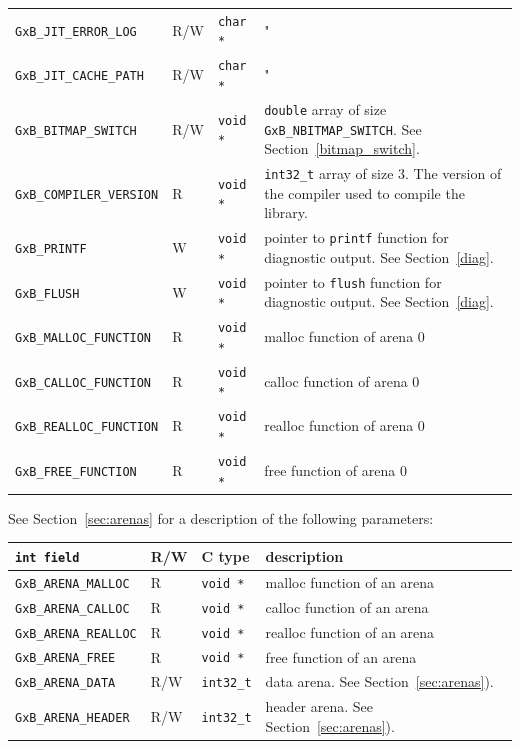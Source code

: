{\begin{tabular}{|l|l|l|p{2.5in}|}
\verb'GxB_JIT_ERROR_LOG'            & R/W  & \verb'char *' & " \\
\verb'GxB_JIT_CACHE_PATH'           & R/W  & \verb'char *' & " \\
\hline
\verb'GxB_BITMAP_SWITCH'            & R/W  & \verb'void *' & \verb'double' array of size \newline
                                                                \verb'GxB_NBITMAP_SWITCH'.  \newline
                                                                See Section~\ref{bitmap_switch}. \\
\verb'GxB_COMPILER_VERSION'         & R    & \verb'void *' & \verb'int32_t' array of size 3.
                                        The version of the compiler used to
                                        compile the library. \\
\verb'GxB_PRINTF'                   & W    & \verb'void *' & pointer to \verb'printf' function for diagnostic output.
                                                                See Section~\ref{diag}. \\
\verb'GxB_FLUSH'                    & W    & \verb'void *' & pointer to \verb'flush' function for diagnostic output.
                                                                See Section~\ref{diag}. \\
\verb'GxB_MALLOC_FUNCTION'  & R    & \verb'void *' & malloc function of arena 0 \\
\verb'GxB_CALLOC_FUNCTION'  & R    & \verb'void *' & calloc function of arena 0 \\
\verb'GxB_REALLOC_FUNCTION' & R    & \verb'void *' & realloc function of arena 0 \\
\verb'GxB_FREE_FUNCTION'    & R    & \verb'void *' & free function of arena 0 \\
\hline
\end{tabular}
}

\newpage
See Section~\ref{sec:arenas} for a description of the following parameters:

\vspace{0.1in}
\noindent
{\small
\begin{tabular}{|l|l|l|p{2.5in}|}
\hline
\verb'int field'                    & R/W  & C type        & description \\
\hline
\verb'GxB_ARENA_MALLOC'  & R    & \verb'void *' & malloc function of an arena \\
\verb'GxB_ARENA_CALLOC'  & R    & \verb'void *' & calloc function of an arena \\
\verb'GxB_ARENA_REALLOC' & R    & \verb'void *' & realloc function of an arena \\
\verb'GxB_ARENA_FREE'    & R    & \verb'void *' & free function of an arena \\
\hline
\verb'GxB_ARENA_DATA'   & R/W & \verb'int32_t' & data arena.  See Section~\ref{sec:arenas}). \\
\verb'GxB_ARENA_HEADER' & R/W & \verb'int32_t' & header arena.  See Section~\ref{sec:arenas}). \\
\hline
\end{tabular}
}

